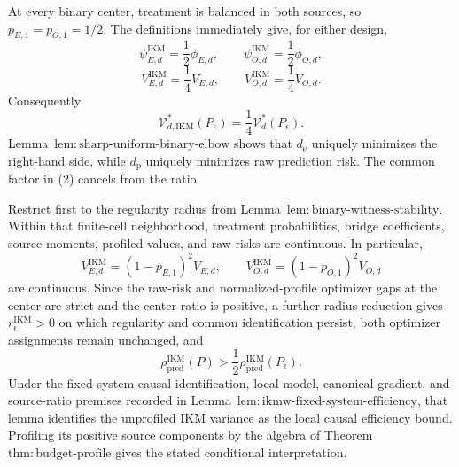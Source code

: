 At every binary center, treatment is balanced in both sources, so \(p_{E,1}=p_{O,1}=1/2\). The definitions immediately give, for either design,
\[
 \psi_{E,d}^{\mathrm{IKM}}=\frac12\phi_{E,d},
 \qquad \psi_{O,d}^{\mathrm{IKM}}=\frac12\phi_{O,d},
\]
\[
 V_{E,d}^{\mathrm{IKM}}=\frac14V_{E,d},
 \qquad V_{O,d}^{\mathrm{IKM}}=\frac14V_{O,d}. \tag{1}
\]
Consequently
\[
 \mathcal V_{d,\mathrm{IKM}}^*(P_\epsilon)
 =\frac14\mathcal V_d^*(P_\epsilon). \tag{2}
\]
Lemma~\(\mathrm{lem{:}sharp\text{-}uniform\text{-}binary\text{-}elbow}\) shows that \(d_{\mathrm e}\) uniquely minimizes the right-hand side, while \(d_{\mathrm p}\) uniquely minimizes raw prediction risk. The common factor in (2) cancels from the ratio.

Restrict first to the regularity radius from Lemma~\(\mathrm{lem{:}binary\text{-}witness\text{-}stability}\). Within that finite-cell neighborhood, treatment probabilities, bridge coefficients, source moments, profiled values, and raw risks are continuous. In particular,
\[
 V_{E,d}^{\mathrm{IKM}}=(1-p_{E,1})^2V_{E,d},
 \qquad
 V_{O,d}^{\mathrm{IKM}}=(1-p_{O,1})^2V_{O,d}
\]
are continuous. Since the raw-risk and normalized-profile optimizer gaps at the center are strict and the center ratio is positive, a further radius reduction gives \(r_\epsilon^{\mathrm{IKM}}>0\) on which regularity and common identification persist, both optimizer assignments remain unchanged, and
\[
 \rho_{\mathrm{pred}}^{\mathrm{IKM}}(P)
 >\frac12\rho_{\mathrm{pred}}^{\mathrm{IKM}}(P_\epsilon).
\]
Under the fixed-system causal-identification, local-model, canonical-gradient, and source-ratio premises recorded in Lemma~\(\mathrm{lem{:}ikmw\text{-}fixed\text{-}system\text{-}efficiency}\), that lemma identifies the unprofiled IKM variance as the local causal efficiency bound. Profiling its positive source components by the algebra of Theorem~\(\mathrm{thm{:}budget\text{-}profile}\) gives the stated conditional interpretation.